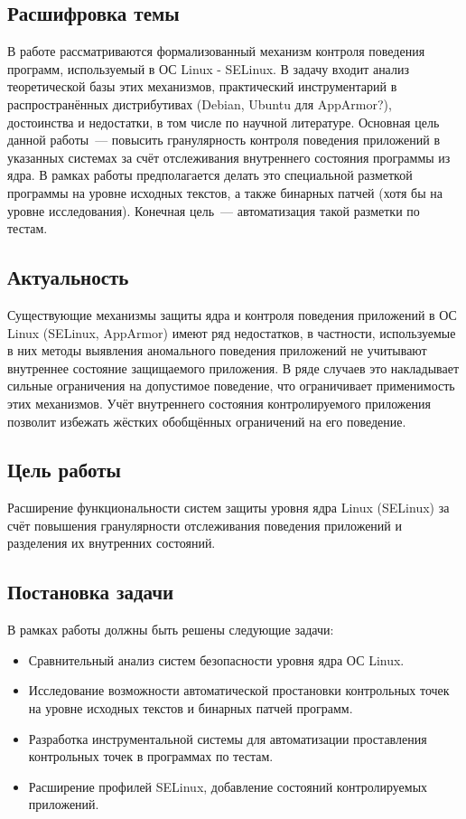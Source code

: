 \subsection{Расшифровка темы}
В работе рассматриваются формализованный 
механизм контроля поведения программ, 
используемый в ОС Linux - SELinux. 
В задачу входит анализ теоретической базы 
этих механизмов, практический инструментарий
в распространённых дистрибутивах (Debian, 
Ubuntu для AppArmor?), достоинства и 
недостатки, в том числе по научной 
литературе. Основная цель данной работы~--- 
повысить гранулярность контроля поведения 
приложений в указанных системах за счёт 
отслеживания внутреннего состояния программы 
из ядра. В рамках работы предполагается делать 
это специальной разметкой программы на уровне 
исходных текстов, а также бинарных патчей (хотя 
бы на уровне исследования). Конечная цель~--- 
автоматизация такой разметки по тестам.

\subsection{Актуальность} 
Существующие механизмы защиты ядра и 
контроля поведения приложений в ОС Linux 
(SELinux, AppArmor) имеют ряд недостатков, 
в частности, используемые в них методы 
выявления аномального поведения приложений 
не учитывают внутреннее состояние защищаемого 
приложения. В ряде случаев это накладывает 
сильные ограничения на допустимое поведение, 
что ограничивает применимость этих механизмов. 
Учёт внутреннего состояния контролируемого 
приложения позволит избежать жёстких обобщённых 
ограничений на его поведение.

\subsection{Цель работы} 
Расширение функциональности систем защиты 
уровня ядра Linux (SELinux) за счёт повышения 
гранулярности отслеживания поведения приложений 
и разделения их внутренних состояний.

\subsection{Постановка задачи}
В рамках работы должны быть решены следующие задачи:
\begin{itemize}
\item Сравнительный анализ систем безопасности 
	уровня ядра ОС Linux.
\item Исследование возможности автоматической 
	простановки контрольных точек на уровне 
	исходных текстов и бинарных патчей программ.
\item Разработка инструментальной системы для 
	автоматизации проставления контрольных точек 
	в программах по тестам. 
\item Расширение профилей SELinux, добавление 
	состояний контролируемых приложений. 
\end{itemize}
\bigskip

